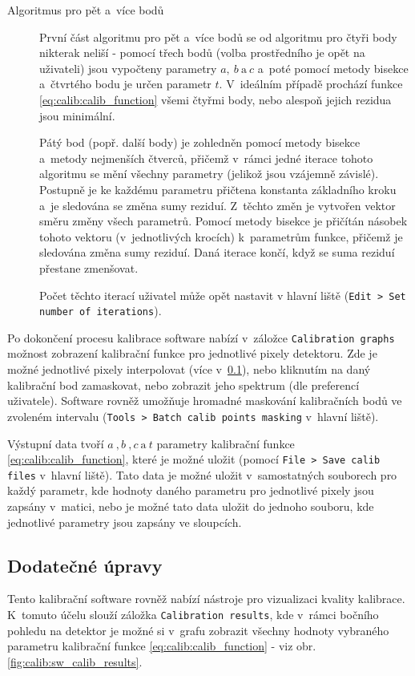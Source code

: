 \begin{description}
	\item[Algoritmus pro pět a~více bodů]
	První část algoritmu pro pět a~více bodů se od algoritmu pro čtyři body nikterak neliší - pomocí třech bodů (volba prostředního je opět na uživateli) jsou vypočteny parametry $a,~b~\text{a}~c$ a~poté pomocí metody bisekce a~čtvrtého bodu je určen parametr $t$. V~ideálním případě prochází funkce \ref{eq:calib:calib_function} všemi čtyřmi body, nebo alespoň jejich rezidua jsou minimální. 

	Pátý bod (popř. další body) je zohledněn pomocí metody bisekce a~metody nejmenších čtverců, přičemž v~rámci jedné iterace tohoto algoritmu se mění všechny parametry (jelikož jsou vzájemně závislé). Postupně je ke každému parametru přičtena konstanta základního kroku a~je sledována se změna sumy reziduí. Z~těchto změn je vytvořen vektor směru změny všech parametrů. Pomocí metody bisekce je přičítán násobek tohoto vektoru (v~jednotlivých krocích) k~parametrům funkce, přičemž je sledována změna sumy reziduí. Daná iterace končí, když se suma reziduí přestane zmenšovat.

	Počet těchto iterací uživatel může opět nastavit v hlavní liště (\texttt{Edit > Set number of iterations}).

\end{description}

Po dokončení procesu kalibrace software nabízí v~záložce \texttt{Calibration graphs} možnost zobrazení kalibrační funkce pro jednotlivé pixely detektoru. Zde je možné jednotlivé pixely interpolovat (více v~\ref{calib:sw:post_process}), nebo kliknutím na daný kalibrační bod zamaskovat, nebo zobrazit jeho spektrum (dle preferencí uživatele). Software rovněž umožňuje hromadné maskování kalibračních bodů ve zvoleném intervalu (\texttt{Tools > Batch calib points masking} v~hlavní liště).

Výstupní data tvoří $a~,b~,c~\text{a}~t$ parametry kalibrační funkce \ref{eq:calib:calib_function}, které je možné uložit (pomocí \texttt{File > Save calib files} v~hlavní liště). Tato data je možné uložit v~samostatných souborech pro každý parametr, kde hodnoty daného parametru pro jednotlivé pixely jsou zapsány v~matici, nebo je možné tato data uložit do jednoho souboru, kde jednotlivé parametry jsou zapsány ve sloupcích.


\subsection{Dodatečné úpravy}\label{calib:sw:post_process}
Tento kalibrační software rovněž nabízí nástroje pro vizualizaci kvality kalibrace. K~tomuto účelu slouží záložka \texttt{Calibration results}, kde v~rámci bočního pohledu na detektor je možné si v~grafu zobrazit všechny hodnoty vybraného parametru kalibrační funkce \ref{eq:calib:calib_function} - viz obr. \ref{fig:calib:sw_calib_results}.


